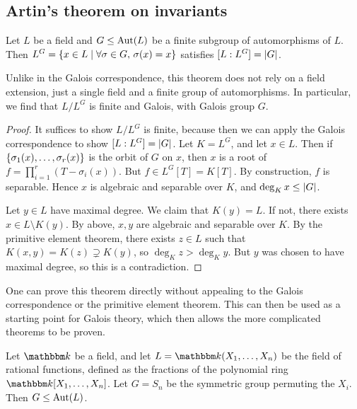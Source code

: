 \subsection{Artin's theorem on invariants}
\begin{theorem}[Artin]
	Let \( L \) be a field and \( G \leq \operatorname{Aut}(L) \) be a finite subgroup of automorphisms of \( L \).
	Then \( L^G = \qty{x \in L \mid \forall \sigma \in G,\, \sigma(x) = x} \) satisfies \( [L:L^G] = \abs{G} \).
\end{theorem}
\begin{remark}
	Unlike in the Galois correspondence, this theorem does not rely on a field extension, just a single field and a finite group of automorphisms.
	In particular, we find that \( L / L^G \) is finite and Galois, with Galois group \( G \).
\end{remark}
\begin{proof}
	It suffices to show \( L/L^G \) is finite, because then we can apply the Galois correspondence to show \( [L:L^G] = \abs{G} \).
	Let \( K = L^G \), and let \( x \in L \).
	Then if \( \qty{\sigma_1(x), \dots, \sigma_r(x)} \) is the orbit of \( G \) on \( x \), then \( x \) is a root of \( f = \prod_{i=1}^r (T - \sigma_i(x)) \).
	But \( f \in L^G[T] = K[T] \).
	By construction, \( f \) is separable.
	Hence \( x \) is algebraic and separable over \( K \), and \( \deg_K x \leq \abs{G} \).

	Let \( y \in L \) have maximal degree.
	We claim that \( K(y) = L \).
	If not, there exists \( x \in L \setminus K(y) \).
	By above, \( x, y \) are algebraic and separable over \( K \).
	By the primitive element theorem, there exists \( z \in L \) such that \( K(x,y) = K(z) \supsetneq K(y) \), so \( \deg_K z > \deg_K y \).
	But \( y \) was chosen to have maximal degree, so this is a contradiction.
\end{proof}
\begin{remark}
	One can prove this theorem directly without appealing to the Galois correspondence or the primitive element theorem.
	This can then be used as a starting point for Galois theory, which then allows the more complicated theorems to be proven.
\end{remark}
\begin{example}
	Let \( \mathbbm k \) be a field, and let \( L = \mathbbm k(X_1, \dots, X_n) \) be the field of rational functions, defined as the fractions of the polynomial ring \( \mathbbm k[X_1, \dots, X_n] \).
	Let \( G = S_n \) be the symmetric group permuting the \( X_i \).
	Then \( G \leq \operatorname{Aut}(L) \).
\end{example}
